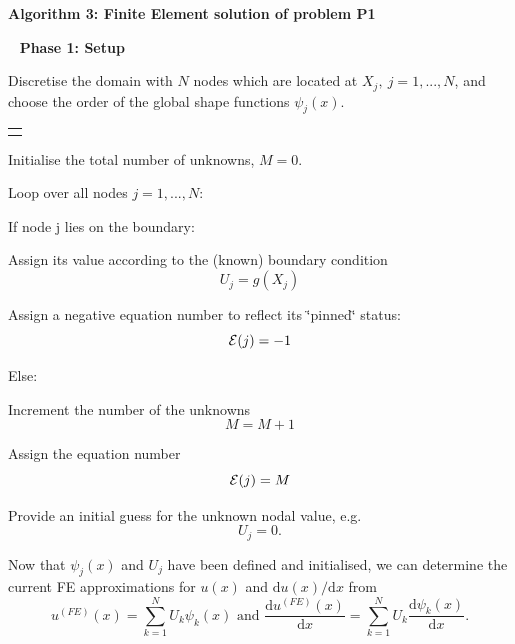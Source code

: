 \begin{center} {\bfseries  Algorithm 3\+: Finite Element solution of problem P1 } \end{center}  ~\newline
 {\bfseries  Phase 1\+: Setup}
\begin{DoxyItemize}
\item Discretise the domain with $ N $ nodes which are located at $ X_j, \ j=1,...,N$, and choose the order of the global shape functions $ \psi_j(x).$ \tabulinesep=1mm
\begin{longtabu} spread 0pt [c]{*{1}{|X[-1]}|}
\hline
\\
\end{longtabu}

\item Initialise the total number of unknowns, $M=0.$
\item Loop over all nodes $ j=1,...,N $\+:
\begin{DoxyItemize}
\item If node j lies on the boundary\+:
\begin{DoxyItemize}
\item Assign its value according to the (known) boundary condition \[ U_j = g(X_j) \]
\item Assign a negative equation number to reflect its \char`\"{}pinned\char`\"{} status\+: \[ {\cal E}(j) = -1 \]
\end{DoxyItemize}
\item Else\+:
\begin{DoxyItemize}
\item Increment the number of the unknowns \[ M=M+1 \]
\item Assign the equation number \[ {\cal E}(j) = M \]
\item Provide an initial guess for the unknown nodal value, e.\+g. \[ U_j=0. \]
\end{DoxyItemize}
\end{DoxyItemize}
\end{DoxyItemize}


\begin{DoxyItemize}
\item Now that $ \psi_j(x) $ and $ U_j $ have been defined and initialised, we can determine the current FE approximations for $ u(x)$ and $ \mbox{d} u(x)/\mbox{d} x$ from \[ u^{(FE)}(x) = \sum_{k=1}^{N} U_k \psi_k(x) \mbox{\ \ \ \ and \ \ \ \ } \frac{\mbox{d} u^{(FE)}(x)}{\mbox{d} x} = \sum_{k=1}^{N} U_k \frac{\mbox{d} \psi_k(x)}{\mbox{d} x}. \]
\end{DoxyItemize}

